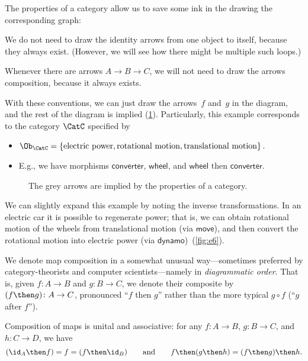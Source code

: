 The properties of a category allow us to save some ink in the drawing the
corresponding graph:
\begin{compactitem}
\item We do not need to draw the identity arrows from one object to itself, because they always exist. (However, we will see how there might be multiple such loops.)
\item  Whenever there are arrows $A\to B \to C$, we will not need to draw the arrows composition, because it always exists.
\end{compactitem}

With these conventions, we can just draw the arrows~$f$ and~$g$ in the diagram,
and the rest of the diagram is implied (\cref{fig:e5}). Particularly, this example corresponds to the category $\CatC$ specified by 
\begin{itemize}
    \item $\Ob_\CatC=\{\text{electric power},\text{rotational motion},\text{translational motion}\}$.
    \item E.g., we have morphisms $\mathsf{converter}$, $\mathsf{wheel}$, and $\mathsf{wheel}\text{ then }\mathsf{converter}$.
\end{itemize}

\begin{figure}[h!]
    \centering
    \caption{\label{fig:e5} The grey arrows are implied by the properties
    of a category.}
\end{figure}


We can slightly expand this example by noting the inverse transformations. In an electric car
it is possible to regenerate power; that is, we can obtain rotational motion of the wheels from
translational motion (via $\mathsf{move}$), and then convert the rotational motion into electric
power (via $\mathsf{dynamo}$)~(\cref{fig:e6}).

\begin{remark}
We denote map composition in a somewhat unusual way---sometimes preferred by category-theorists and computer scientists---namely in \emph{diagrammatic order}. That is, given $f\colon A\to B$ and $g\colon B\to C$, we denote their composite by $(f\then g)\colon A\to C$, pronounced ``$f$ then $g$'' rather than the more typical $g\circ f$ (``$g$ after $f$'').

Composition of maps is unital and associative: for any $f\colon A\to B$, $g\colon B\to C$, and $h\colon C\to D$, we have
\begin{equation}
(\id_A\then f)=f=(f \then \id_B)\qquad\text{and}\qquad f\then (g\then h)=(f\then g)\then h.
\end{equation}
\end{remark}

